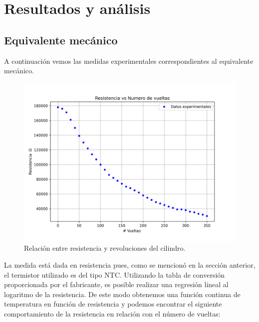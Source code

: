 \documentclass{article}
\begin{document}
\section{Resultados y análisis}

\subsection{Equivalente mecánico}
A continuación vemos las medidas experimentales correspondientes al equivalente mecánico.

\begin{figure}[H]
    \centering
    \includegraphics[scale=0.5]{RvsV.png}
    \caption{Relación entre resistencia y revoluciones del cilindro.}
    \label{fig:mecresrev}
\end{figure}

La medida está dada en resistencia pues, como se mencionó en la sección anterior, el termistor utilizado es del tipo NTC. Utilizando la tabla de conversión proporcionada por el fabricante\cite{pasco}, es posible realizar una regresión lineal al logaritmo de la resistencia. De este modo obtenemos una función continua de temperatura en función de resistencia y podemos encontrar el siguiente comportamiento de la resistencia en relación con el número de vueltas:
\end{document}
